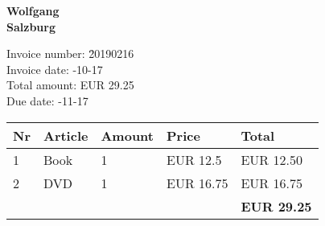 \documentclass[a4paper]{article}
\begin{document}
\noindent\textbf{Wolfgang\\Salzburg}

\vspace{8mm}



\begin{tabbing}
Invoice number: \= 20190216 \\
Invoice date:   -10-17 \\
Total amount:   \> EUR 29.25 \\
Due date:       -11-17 \\
\end{tabbing}

\begin{tabular}{lp{30mm}ll|l}\\ \hline
{\bfseries Nr} &
{\bfseries Article} &
{\bfseries Amount} &
{\bfseries Price} &
{\bfseries Total} \\ \hline\hline
1 &Book &1 &EUR 12.5 &EUR 12.50 \\2 &DVD &1 &EUR 16.75 &EUR 16.75\\\hline
 & & & & \textbf{EUR 29.25} \\
\end{tabular}
\end{document}
